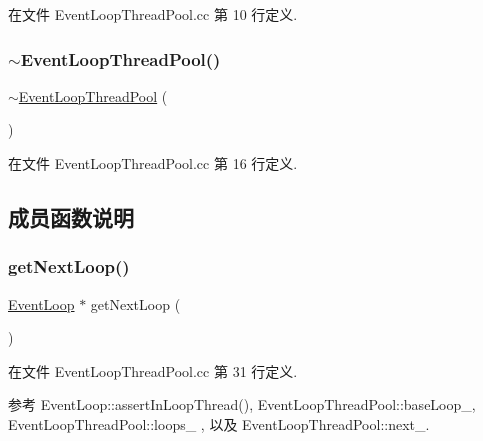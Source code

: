在文件 Event\+Loop\+Thread\+Pool.\+cc 第 10 行定义.

\mbox{\label{classmuduo_1_1EventLoopThreadPool_a009ff3f40b47ffa7ff8ed249e4be9864}} 
\subsubsection{\texorpdfstring{$\sim$\+Event\+Loop\+Thread\+Pool()}{~EventLoopThreadPool()}}
{\footnotesize\ttfamily $\sim$\hyperlink{classmuduo_1_1EventLoopThreadPool}{Event\+Loop\+Thread\+Pool} (\begin{DoxyParamCaption}{ }\end{DoxyParamCaption})}



在文件 Event\+Loop\+Thread\+Pool.\+cc 第 16 行定义.



\subsection{成员函数说明}
\mbox{\label{classmuduo_1_1EventLoopThreadPool_ad79a4dd0cdd1358bfde1170759543c7d}} 
\subsubsection{\texorpdfstring{get\+Next\+Loop()}{getNextLoop()}}
{\footnotesize\ttfamily \hyperlink{classmuduo_1_1EventLoop}{Event\+Loop} $\ast$ get\+Next\+Loop (\begin{DoxyParamCaption}{ }\end{DoxyParamCaption})}



在文件 Event\+Loop\+Thread\+Pool.\+cc 第 31 行定义.



参考 Event\+Loop\+::assert\+In\+Loop\+Thread(), Event\+Loop\+Thread\+Pool\+::base\+Loop\+\_\+, Event\+Loop\+Thread\+Pool\+::loops\+\_\+ , 以及 Event\+Loop\+Thread\+Pool\+::next\+\_\+.



